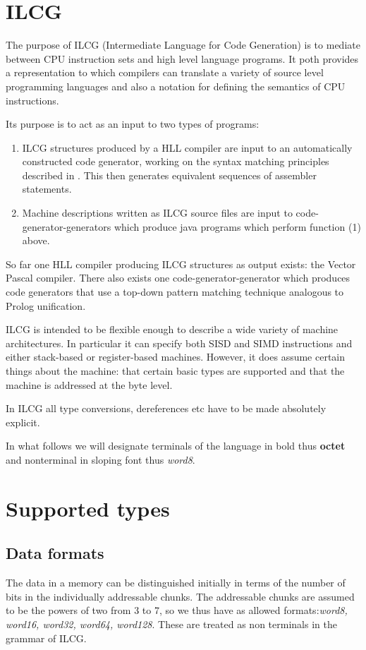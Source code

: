 {{\section{ILCG }\label{ilcgintro}
The purpose of ILCG (Intermediate Language for Code Generation) is to 
mediate between CPU instruction sets and high level language programs.
It poth provides a representation to which compilers can translate
a variety of source level programming languages and also a notation for
defining the semantics of CPU instructions.


Its purpose is to act as an input to two types of programs:
\begin{enumerate}\item ILCG structures produced by a HLL compiler are input to 
an automatically constructed code generator,
working on the syntax matching principles described in \cite{graham80}. This then
generates equivalent sequences of assembler statements.
\item Machine descriptions written as ILCG source files are input to
code-generator-generators which produce java programs which perform function (1)
above.
\end{enumerate}
So far one HLL compiler producing ILCG structures as output
exists: the Vector Pascal compiler.
There also exists one code-generator-generator which produces code generators
that use a top-down pattern matching technique analogous to Prolog unification.

ILCG is   intended to be flexible enough to describe a wide variety of machine
architectures. In particular it can specify both SISD and SIMD instructions and
either stack-based or register-based machines.
 However, it does assume certain
things about the machine:  that certain basic types are supported and that
the machine is addressed at the byte level.

In ILCG all type conversions, dereferences etc have to be made
absolutely explicit.

In what follows we will designate terminals of the language in bold thus {\bf octet}
and nonterminal in sloping font thus {\sl word8}.
\section{Supported types}
\subsection{Data formats}
The data in a memory can be distinguished initially in terms of the number of bits
in the individually addressable chunks. The addressable chunks are assumed to be the
powers of two from 3 to 7, so we thus have as allowed formats:{\sl word8, word16, word32, word64,
word128}.
These are treated as non terminals in the grammar of ILCG.

}}
